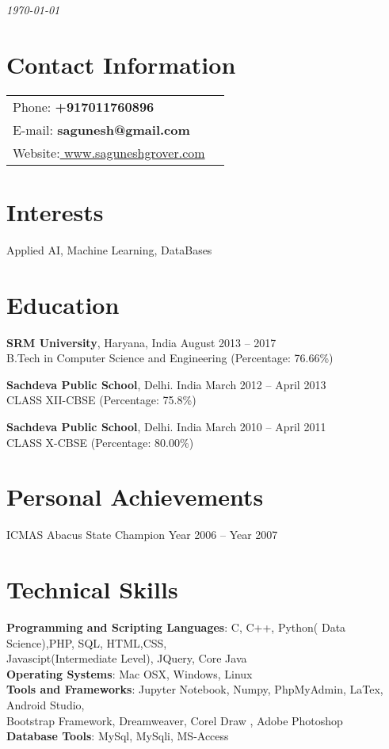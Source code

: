 \documentclass[margin,line]{res}
\begin{document}
 \hfill {\em \today}

\begin{resume}
\section{\sc Contact Information}

\vspace{.05in}
\begin{tabular}{@{}p{3.5in}p{3in}}
{ Phone:} \bf +917011760896 \\
 {E-mail:} \bf  sagunesh@gmail.com\\
 {Website:}\url{ www.saguneshgrover.com}
\end{tabular}


\section{\sc Interests}

Applied AI, Machine Learning, DataBases

\section{\sc Education}
{\bf SRM University}, Haryana, India \hfill August 2013 -- 2017\\
B.Tech in Computer Science and Engineering \hfill(Percentage: 76.66\%)

{\bf Sachdeva Public School}, Delhi. India \hfill March 2012 -- April 2013\\
CLASS XII-CBSE \hfill(Percentage: 75.8\%)

{\bf Sachdeva Public School}, Delhi. India \hfill March 2010 -- April 2011\\
CLASS X-CBSE \hfill(Percentage: 80.00\%)

\section{\sc Personal Achievements}
ICMAS Abacus State Champion \hfill Year 2006 --  Year 2007\\

\section{\sc Technical Skills}
{\bf Programming and Scripting Languages}:  C, C++, Python( Data Science),PHP, SQL, HTML,CSS,\\Javascipt(Intermediate Level), JQuery,  Core Java\\
{\bf Operating Systems}: Mac OSX, Windows, Linux\\
{\bf Tools and Frameworks}: Jupyter Notebook, Numpy, PhpMyAdmin, LaTex, Android Studio,\\  Bootstrap Framework, Dreamweaver, Corel Draw , Adobe Photoshop\\
{\bf Database Tools}:  MySql, MySqli, MS-Access 

\end{resume}
\end{document}
